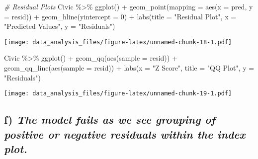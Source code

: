 \documentclass[
]{article}
\newenvironment{Shaded}{\begin{snugshade}}{\end{snugshade}}
\newcommand{\AttributeTok}[1]{\textcolor[rgb]{0.77,0.63,0.00}{#1}}
\newcommand{\CommentTok}[1]{\textcolor[rgb]{0.56,0.35,0.01}{\textit{#1}}}
\newcommand{\DecValTok}[1]{\textcolor[rgb]{0.00,0.00,0.81}{#1}}
\newcommand{\FunctionTok}[1]{\textcolor[rgb]{0.00,0.00,0.00}{#1}}
\newcommand{\NormalTok}[1]{#1}
\newcommand{\SpecialCharTok}[1]{\textcolor[rgb]{0.00,0.00,0.00}{#1}}
\newcommand{\StringTok}[1]{\textcolor[rgb]{0.31,0.60,0.02}{#1}}
\begin{document}
\begin{Shaded}
\begin{Highlighting}[]
\CommentTok{\# Residual Plots}
\NormalTok{Civic }\SpecialCharTok{\%\textgreater{}\%}
  \FunctionTok{ggplot}\NormalTok{() }\SpecialCharTok{+}
  \FunctionTok{geom\_point}\NormalTok{(}\AttributeTok{mapping =} \FunctionTok{aes}\NormalTok{(}\AttributeTok{x =}\NormalTok{ pred, }\AttributeTok{y =}\NormalTok{ resid)) }\SpecialCharTok{+}
  \FunctionTok{geom\_hline}\NormalTok{(}\AttributeTok{yintercept =} \DecValTok{0}\NormalTok{) }\SpecialCharTok{+}
  \FunctionTok{labs}\NormalTok{(}\AttributeTok{title =} \StringTok{"Residual Plot"}\NormalTok{,}
       \AttributeTok{x =} \StringTok{"Predicted Values"}\NormalTok{,}
       \AttributeTok{y =} \StringTok{"Residuals"}\NormalTok{)}
\end{Highlighting}
\end{Shaded}

\texttt{[image: data\_analysis\_files/figure-latex/unnamed-chunk-18-1.pdf]}

\begin{Shaded}
\begin{Highlighting}[]
\NormalTok{Civic }\SpecialCharTok{\%\textgreater{}\%}
  \FunctionTok{ggplot}\NormalTok{() }\SpecialCharTok{+}
  \FunctionTok{geom\_qq}\NormalTok{(}\FunctionTok{aes}\NormalTok{(}\AttributeTok{sample =}\NormalTok{ resid)) }\SpecialCharTok{+}
  \FunctionTok{geom\_qq\_line}\NormalTok{(}\FunctionTok{aes}\NormalTok{(}\AttributeTok{sample =}\NormalTok{ resid)) }\SpecialCharTok{+}
  \FunctionTok{labs}\NormalTok{(}\AttributeTok{x =} \StringTok{"Z Score"}\NormalTok{,}
       \AttributeTok{title =} \StringTok{"QQ Plot"}\NormalTok{,}
       \AttributeTok{y =} \StringTok{"Residuals"}\NormalTok{)}
\end{Highlighting}
\end{Shaded}

\texttt{[image: data\_analysis\_files/figure-latex/unnamed-chunk-19-1.pdf]}

\hypertarget{f-the-model-fails-as-we-see-grouping-of-positive-or-negative-residuals-within-the-index-plot.}{%
\subsection{\texorpdfstring{f) \emph{The model fails as we see grouping
of positive or negative residuals within the index
plot.}}{f) The model fails as we see grouping of positive or negative residuals within the index plot.}}\label{f-the-model-fails-as-we-see-grouping-of-positive-or-negative-residuals-within-the-index-plot.}}
\end{document}
